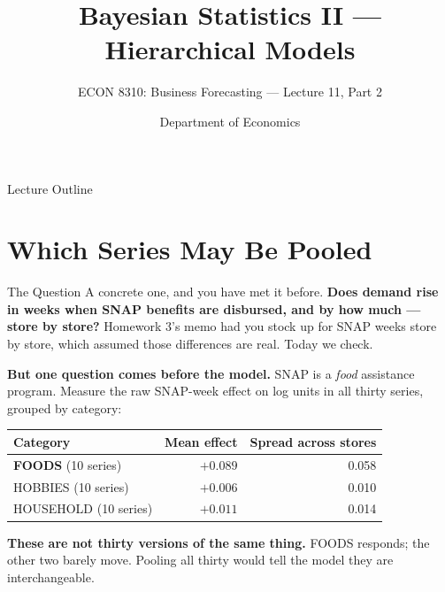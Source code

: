 \documentclass[aspectratio=169, 11pt]{beamer}
\title[Hierarchical Models]{Bayesian Statistics II --- Hierarchical Models}
\subtitle{ECON 8310: Business Forecasting --- Lecture 11, Part 2}
\author{Department of Economics}
\institute{University of Nebraska at Omaha}
\begin{document}

\begin{frame}
  \titlepage
\end{frame}

\begin{frame}{Lecture Outline}
  \tableofcontents
\end{frame}

\section{Which Series May Be Pooled}


\begin{frame}{The Question}
  A concrete one, and you have met it before. \textbf{Does demand rise in weeks when SNAP
  benefits are disbursed, and by how much --- store by store?} Homework 3's memo had you stock up
  for SNAP weeks store by store, which assumed those differences are real. Today we check.

  \vspace{0.15cm}
  \textbf{But one question comes before the model.} SNAP is a \emph{food} assistance program.
  Measure the raw SNAP-week effect on log units in all thirty series, grouped by category:

  \begin{center}
    {\small
    \begin{tabular}{lrr}
      \toprule
      \textbf{Category} & \textbf{Mean effect} & \textbf{Spread across stores} \\
      \midrule
      \textbf{FOODS} (10 series) & $+0.089$ & 0.058 \\
      HOBBIES (10 series) & $+0.006$ & 0.010 \\
      HOUSEHOLD (10 series) & $+0.011$ & 0.014 \\
      \bottomrule
    \end{tabular}
    }
  \end{center}

  \vspace{0.05cm}
  \textbf{These are not thirty versions of the same thing.} FOODS responds; the other two barely
  move. Pooling all thirty would tell the model they are interchangeable.
\end{frame}
\end{document}
